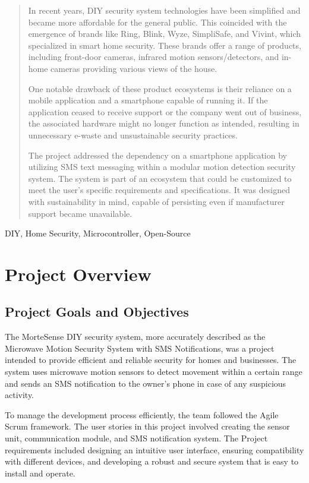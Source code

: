 \documentclass[conference]{IEEEtran}
\begin{document}
\begin{abstract}
      In recent years, DIY security system technologies have been simplified and became
      more affordable for the general public. This coincided with the emergence of brands
      like Ring, Blink, Wyze, SimpliSafe, and Vivint, which specialized in smart home
      security. These brands offer a range of products, including front-door cameras,
      infrared motion sensors/detectors, and in-home cameras providing various views of
      the house.

      One notable drawback of these product ecosystems is their reliance on a mobile
      application and a smartphone capable of running it. If the application ceased to
      receive support or the company went out of business, the associated hardware might
      no longer function as intended, resulting in unnecessary e-waste and unsustainable
      security practices.

      The project addressed the dependency on a smartphone application by utilizing SMS
      text messaging within a modular motion detection security system. The system is part
      of an ecosystem that could be customized to meet the user's specific requirements
      and specifications. It was designed with sustainability in mind, capable of
      persisting even if manufacturer support became unavailable.
\end{abstract}

\begin{IEEEkeywords}
      DIY, Home Security, Microcontroller, Open-Source
\end{IEEEkeywords}

\section{Project Overview}

\subsection{Project Goals and Objectives}
The MorteSense DIY security system, more accurately described as the Microwave Motion
Security System with SMS Notifications, was a project intended to provide efficient
and reliable security for homes and businesses. The system uses microwave motion sensors
to detect movement within a certain range and sends an SMS notification to the owner's
phone in case of any suspicious activity.

To manage the development process efficiently, the team followed the Agile Scrum framework.
The user stories in this project involved creating the sensor unit, communication module,
and SMS notification system. The Project requirements included designing an intuitive user
interface, ensuring compatibility with different devices, and developing a robust and
secure system that is easy to install and operate.
\end{document}

